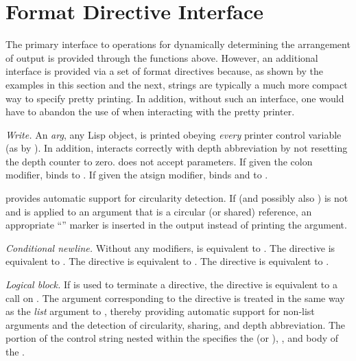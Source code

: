 \section{Format Directive Interface}
\label{PPRINT-FORMAT-DIRECTIVES-SECTION}

The primary interface to operations for dynamically determining the
arrangement of output is provided through the functions above.  However, an
additional interface is provided via a set of format directives
because, as shown by the examples in this section and the
next,  strings are typically a much more compact way to specify
pretty printing.  In addition, without such an interface, one would have to
abandon the use of  when interacting with the pretty printer.

\begin{flushdesc}
\item[\cd{{\Xtilde}W}]
{\it Write.}  An {\it arg}, any Lisp object, is printed obeying {\it every}
printer control variable (as by ).  In addition, 
interacts correctly with depth abbreviation by not resetting the depth
counter to zero.   does not accept parameters.  If given the colon
modifier,  binds  to .  If given the atsign
modifier,  binds  and  to 
.

 provides automatic support for circularity detection.  If
 (and possibly also ) is not  and
 is applied to an argument that is a circular (or shared) reference,
an appropriate ``'' marker is inserted in the output
instead of printing the argument.

\item[\cd{{\Xtilde}{\Xunderscore}}]
{\it Conditional newline.} Without any modifiers,
\cd{{\Xtilde}{\Xunderscore}} is equivalent to
.
The directive \cd{{\Xtilde}{\Xatsign}{\Xunderscore}} is
equivalent to .
The directive \cd{{\Xtilde}:{\Xunderscore}}
is equivalent to .
The directive \cd{{\Xtilde}:{\Xatsign}{\Xunderscore}} is
equivalent to .


\item[\cd{{\Xtilde}<{\it str}{\Xtilde}:>}]
{\it Logical block.} If \cd{{\Xtilde}:>} is used to terminate a
 directive, the directive is equivalent to a call on
.  The  argument corresponding to the
 directive is treated in the same way as the {\it list}
argument to , thereby providing automatic support for
non-list arguments and the detection of circularity, sharing, and depth abbreviation. 
The portion of the  control string nested within the
 specifies the  (or ),
, and body of the .


\end{flushdesc}
